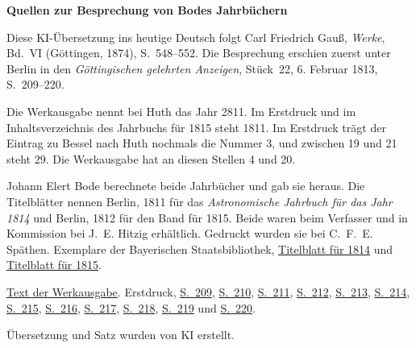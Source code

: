 \clearpage\thispagestyle{empty}
\begin{center}\textbf{Quellen zur Besprechung von Bodes Jahrbüchern}\end{center}
\noindent Diese KI-Übersetzung ins heutige Deutsch folgt Carl Friedrich Gauß, \textit{Werke}, Bd.~VI (Göttingen, 1874), S.~548--552. Die Besprechung erschien zuerst unter Berlin in den \textit{Göttingischen gelehrten Anzeigen}, Stück~22, 6. Februar 1813, S.~209--220.
\par\smallskip\noindent Die Werkausgabe nennt bei Huth das Jahr 2811. Im Erstdruck und im Inhaltsverzeichnis des Jahrbuchs für 1815 steht 1811. Im Erstdruck trägt der Eintrag zu Bessel nach Huth nochmals die Nummer 3, und zwischen 19 und 21 steht 29. Die Werkausgabe hat an diesen Stellen 4 und 20.
\par\smallskip\noindent Johann Elert Bode berechnete beide Jahrbücher und gab sie heraus. Die Titelblätter nennen Berlin, 1811 für das \textit{Astronomische Jahrbuch für das Jahr 1814} und Berlin, 1812 für den Band für 1815. Beide waren beim Verfasser und in Kommission bei J.~E. Hitzig erhältlich. Gedruckt wurden sie bei C.~F.~E. Späthen. Exemplare der Bayerischen Staatsbibliothek, \href{https://api.digitale-sammlungen.de/iiif/image/v2/bsb10538343_00005/full/1400,/0/default.jpg}{Titelblatt für 1814} und \href{https://api.digitale-sammlungen.de/iiif/image/v2/bsb10538344_00005/full/1400,/0/default.jpg}{Titelblatt für 1815}.
\par\smallskip\noindent \href{https://gdz.sub.uni-goettingen.de/id/PPN236007467}{Text der Werkausgabe}. Erstdruck, \href{https://images.p.sub.uni-goettingen.de/iiif/image/gdz:PPN319721507_1813:00000211/full/1650,/0/default.jpg}{S.~209}, \href{https://images.p.sub.uni-goettingen.de/iiif/image/gdz:PPN319721507_1813:00000212/full/1650,/0/default.jpg}{S.~210}, \href{https://images.p.sub.uni-goettingen.de/iiif/image/gdz:PPN319721507_1813:00000213/full/1650,/0/default.jpg}{S.~211}, \href{https://images.p.sub.uni-goettingen.de/iiif/image/gdz:PPN319721507_1813:00000214/full/1650,/0/default.jpg}{S.~212}, \href{https://images.p.sub.uni-goettingen.de/iiif/image/gdz:PPN319721507_1813:00000215/full/1650,/0/default.jpg}{S.~213}, \href{https://images.p.sub.uni-goettingen.de/iiif/image/gdz:PPN319721507_1813:00000216/full/1650,/0/default.jpg}{S.~214}, \href{https://images.p.sub.uni-goettingen.de/iiif/image/gdz:PPN319721507_1813:00000217/full/1650,/0/default.jpg}{S.~215}, \href{https://images.p.sub.uni-goettingen.de/iiif/image/gdz:PPN319721507_1813:00000218/full/1650,/0/default.jpg}{S.~216}, \href{https://images.p.sub.uni-goettingen.de/iiif/image/gdz:PPN319721507_1813:00000219/full/1650,/0/default.jpg}{S.~217}, \href{https://images.p.sub.uni-goettingen.de/iiif/image/gdz:PPN319721507_1813:00000220/full/1650,/0/default.jpg}{S.~218}, \href{https://images.p.sub.uni-goettingen.de/iiif/image/gdz:PPN319721507_1813:00000221/full/1650,/0/default.jpg}{S.~219} und \href{https://images.p.sub.uni-goettingen.de/iiif/image/gdz:PPN319721507_1813:00000222/full/1650,/0/default.jpg}{S.~220}.
\par\smallskip\noindent Übersetzung und Satz wurden von KI erstellt.
\clearpage
